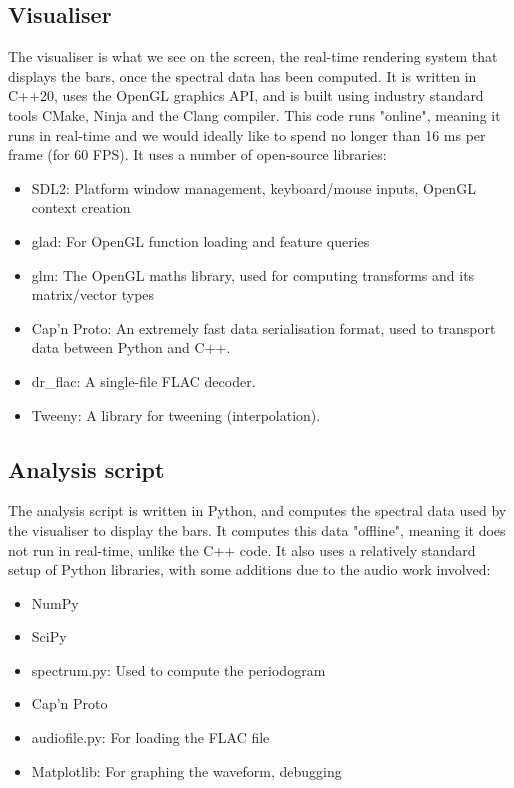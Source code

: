 \documentclass[11pt]{article}
\begin{document}
\subsection{Visualiser}
The visualiser is what we see on the screen, the real-time rendering system that displays the bars, once the
spectral data has been computed. It is written in C++20, uses the OpenGL graphics API, and is built using
industry standard tools CMake, Ninja and the Clang compiler. This code runs "online", meaning it runs in
real-time and we would ideally like to spend no longer than 16 ms per frame (for 60 FPS). It uses a number of
open-source libraries:
\begin{itemize}
	\item SDL2: Platform window management, keyboard/mouse inputs, OpenGL context creation
	\item glad: For OpenGL function loading and feature queries
    \item glm: The OpenGL maths library, used for computing transforms and its matrix/vector types
    \item Cap'n Proto: An extremely fast data serialisation format, used to transport data between Python and
        C++.
    \item dr\_flac: A single-file FLAC decoder.
    \item Tweeny: A library for tweening (interpolation).
\end{itemize}

\subsection{Analysis script}
The analysis script is written in Python, and computes the spectral data used by the visualiser to display the
bars. It computes this data "offline", meaning it does not run in real-time, unlike the C++ code. It also uses
a relatively standard setup of Python libraries, with some additions due to the audio work involved:
\begin{itemize}
    \item NumPy
    \item SciPy
    \item spectrum.py: Used to compute the periodogram
    \item Cap'n Proto
    \item audiofile.py: For loading the FLAC file
    \item Matplotlib: For graphing the waveform, debugging
\end{itemize}
\end{document}
